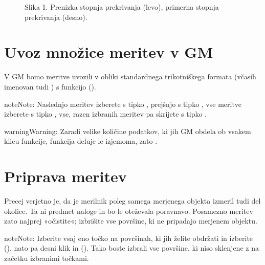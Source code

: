 \documentclass[letterpaper,10pt,english]{sphinxmanual}
\begin{document}
\begin{figure}[htbp]
\centering
\capstart

\noindent{}
\caption{Slika 1. Prenizka stopnja prekrivanja (levo), primerna stopnja prekrivanja (desno).}\label{\detokenize{obdelava_3D_meritev:id2}}\end{figure}


\section{Uvoz množice meritev v GM}
\label{\detokenize{obdelava_3D_meritev:uvoz-mnozice-meritev-v-gm}}
\sphinxAtStartPar
V GM bomo meritve uvozili v obliki standardnega trikotniškega formata  (včasih imenovan tudi ) s funkcijo  ().

\begin{sphinxadmonition}{note}{Note:}
\sphinxAtStartPar
Naslednjo meritev izberete s tipko , prejšnjo s tipko , vse meritve izberete s tipko , vse, razen izbranih meritev pa skrijete s tipko .
\end{sphinxadmonition}

\begin{sphinxadmonition}{warning}{Warning:}
\sphinxAtStartPar
Zaradi velike količine podatkov, ki jih GM obdela ob vsakem klicu funkcije, funkcija  deluje le izjemoma, zato .
\end{sphinxadmonition}


\section{Priprava meritev}
\label{\detokenize{obdelava_3D_meritev:priprava-meritev}}
\sphinxAtStartPar
Precej verjetno je, da je merilnik poleg samega merjenega objekta izmeril tudi del okolice. Ta ni predmet naloge in bo le oteževala poravnavo. Posamezno meritev zato najprej »očistite«; izbrišite vse površine, ki ne pripadajo merjenem objektu.

\begin{sphinxadmonition}{note}{Note:}
\sphinxAtStartPar
Izberite vsaj eno točko na površinah, ki jih želite obdržati in izberite  (), nato pa desni klik in  (). Tako boste izbrali vse površine, ki niso sklenjene z na začetku izbranimi točkami.
\end{sphinxadmonition}
\end{document}
